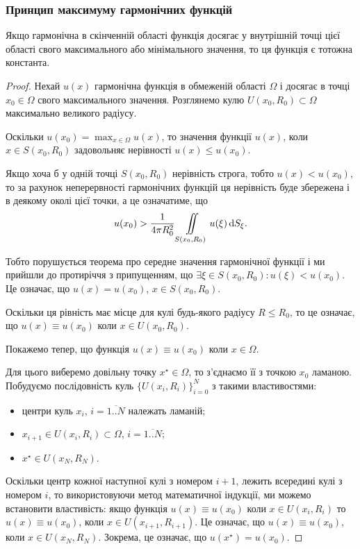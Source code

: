 \subsubsection{Принцип максимуму гармонічних функцій}

\begin{theorem}
	Якщо гармонічна в скінченній області функція досягає у внутрішній точці цієї області свого максимального або мінімального значення, то ця функція є тотожна константа.
\end{theorem}

\begin{proof}
	Нехай $u(x)$ гармонічна функція в обмеженій області $\Omega$ і досягає в точці $x_0 \in \Omega$ свого максимального значення. Розглянемо кулю $U(x_0, R_0) \subset \Omega$ максимально великого радіусу. \medskip

	Оскільки $u(x_0) = \max_{x \in \Omega} u(x)$, то значення функції $u(x)$, коли $x \in S(x_0, R_0)$ задовольняє нерівності $u(x) \le u(x_0)$. \medskip

	Якщо хоча б у одній точці $S(x_0, R_0)$ нерівність строга, тобто $u(x) < u(x_0)$, то за рахунок неперервності гармонічних функцій ця нерівність буде збережена і в деякому околі цієї точки, а це означатиме, що
	\begin{equation}
		u(x_0) > \frac{1}{4 \pi R_0^2} \displaystyle\iint\limits_{S(x_0,R_0)} u(\xi) \mathop{}\!\mathrm{d} S_\xi.
	\end{equation}

	Тобто порушується теорема про середне значення гармонічної функції і ми прийшли до протиріччя з припущенням, що $\exists \xi \in S(x_0, R_0): u(\xi) < u(x_0)$. Це означає, що $u(x) = u(x_0)$, $x \in S(x_0, R_0)$. \medskip

	Оскільки ця рівність має місце для кулі будь-якого радіусу $R \le R_0$, то це означає, що $u(x) \equiv u(x_0)$  коли $x \in U(x_0, R_0)$. \medskip

	Покажемо тепер, що функція $u(x) \equiv u(x_0)$  коли $x \in \Omega$. \medskip

	Для цього виберемо довільну точку $x^\star \in \Omega$, то з'єднаємо її з точкою $x_0$ ламаною. Побудуємо послідовність куль $\{U(x_i, R_i)\}_{i=0}^N$ з такими властивостями: 
	\begin{itemize}
		\item центри куль $x_i$, $i = \overline{1..N}$ належать ламаній;
		\item $x_{i + 1} \in U(x_i, R_i) \subset \Omega$, $i = \overline{1..N}$;
		\item $x^\star \in U(x_N, R_N)$.
	\end{itemize}

	Оскільки центр кожної наступної кулі з номером $i + 1$, лежить всередині кулі з номером $i$, то використовуючи метод математичної індукції, ми можемо встановити властивість: якщо функція $u(x) \equiv u(x_0)$ коли $x \in U(x_i, R_i)$ то $u(x) \equiv u(x_0)$, коли $x \in U(x_{i+1}, R_{i+1})$. Це означає, що $u(x) \equiv u(x_0)$, коли $x \in U(x_N, R_N)$. Зокрема, це означає, що $u(x^\star) = u(x_0)$.
\end{proof}


